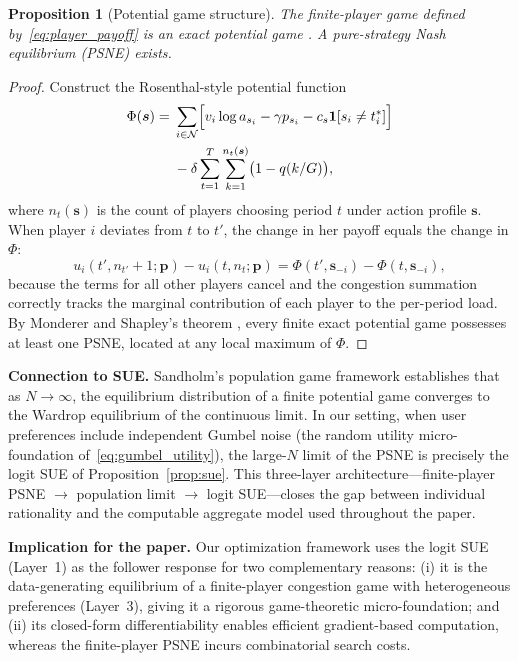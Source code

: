 \documentclass[11pt]{article}
\newtheorem{proposition}{Proposition}
\begin{document}
\begin{proposition}[Potential game structure]
  \label{prop:potential}
  The finite-player game defined by~\eqref{eq:player_payoff} is an exact
  potential game \cite{monderer1996potential}. A pure-strategy Nash
  equilibrium (PSNE) exists.
\end{proposition}

\begin{proof}
  Construct the Rosenthal-style potential function
  \begin{align}
    \Phi(\boldsymbol{s}) = \;&
    \sum_{i\in\mathcal{N}} \Bigl[ v_i\log a_{s_i} - \gamma p_{s_i}
    - c_s\mathbf{1}[s_i\neq t_i^*] \Bigr] \nonumber\\
    &- \delta \sum_{t=1}^{T} \sum_{k=1}^{n_t(\boldsymbol{s})} \bigl(1 - q(k/G)\bigr),
  \end{align}
  where $n_t(\boldsymbol{s})$ is the count of players choosing period $t$
  under action profile $\boldsymbol{s}$. When player $i$ deviates from $t$
  to $t'$, the change in her payoff equals the change in $\Phi$:
  \[
  u_i(t', n_{t'}+1;\boldsymbol{p}) - u_i(t, n_t;\boldsymbol{p})
  = \Phi(t', \boldsymbol{s}_{-i}) - \Phi(t, \boldsymbol{s}_{-i}),
  \]
  because the terms for all other players cancel and the congestion summation
  correctly tracks the marginal contribution of each player to the per-period
  load. By Monderer and Shapley's theorem \cite{monderer1996potential},
  every finite exact potential game possesses at least one PSNE, located at
  any local maximum of $\Phi$.
\end{proof}

\textbf{Connection to SUE.} Sandholm's population game framework
\cite{sandholm2010population} establishes that as $N\to\infty$, the
equilibrium distribution of a finite potential game converges to the
Wardrop equilibrium of the continuous limit. In our setting, when user
preferences include independent Gumbel noise (the random utility
micro-foundation of~\eqref{eq:gumbel_utility}), the large-$N$ limit of
the PSNE is precisely the logit SUE of Proposition~\ref{prop:sue}. This
three-layer architecture---finite-player PSNE $\to$ population limit
$\to$ logit SUE---closes the gap between individual rationality and the
computable aggregate model used throughout the paper.

\textbf{Implication for the paper.} Our optimization framework uses the
logit SUE (Layer~1) as the follower response for two complementary reasons:
(i) it is the data-generating equilibrium of a finite-player congestion
game with heterogeneous preferences (Layer~3), giving it a rigorous
game-theoretic micro-foundation; and (ii) its closed-form
differentiability enables efficient gradient-based computation, whereas
the finite-player PSNE incurs combinatorial search costs.
\end{document}
